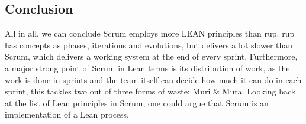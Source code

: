\subsection{Conclusion}
All in all, we can conclude Scrum employs more LEAN principles than \ac{rup}. \ac{rup} has concepts as phases, iterations and evolutions, but delivers a lot slower than Scrum, which delivers a working system at the end of every sprint. Furthermore, a major strong point of Scrum in Lean terms is its distribution of work, as the work is done in sprints and the team itself can decide how much it can do in each sprint, this tackles two out of three forms of waste: Muri \& Mura. Looking back at the list of Lean principles in Scrum, one could argue that Scrum is an implementation of a Lean process. 